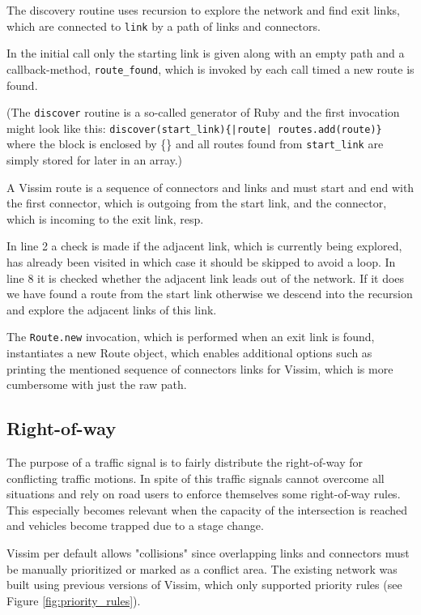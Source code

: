 The discovery routine uses recursion to explore the network and find exit links, which are connected to \verb|link| by a path of links and connectors.

In the initial call only the starting link is given along with an empty path and a callback-method, \verb|route_found|, which is invoked by each call timed a new route is found. 

(The \verb|discover| routine is a so-called generator of Ruby and the first invocation might look like this: \verb+discover(start_link){|route| routes.add(route)}+ where the block is enclosed by \{\} and all routes found from \verb|start_link| are simply stored for later in an array.)

A Vissim route is a sequence of connectors and links and must start and end with the first connector, which is outgoing from the start link, and the connector, which is incoming to the exit link, resp.

In line 2 a check is made if the adjacent link, which is currently being explored, has already been visited in which case it should be skipped to avoid a loop. In line 8 it is checked whether the adjacent link leads out of the network. If it does we have found a route from the start link otherwise we descend into the recursion and explore the adjacent links of this link.

The \verb|Route.new| invocation, which is performed when an exit link is found, instantiates a new Route object, which enables additional options such as printing the mentioned sequence of connectors links for Vissim, which is more cumbersome with just the raw path.

\subsection{Right-of-way}
The purpose of a traffic signal is to fairly distribute the right-of-way for conflicting traffic motions.  In spite of this traffic signals cannot overcome all situations and rely on road users to enforce themselves some right-of-way rules. This especially becomes relevant when the capacity of the intersection is reached and vehicles become trapped due to a stage change.

Vissim per default allows "collisions" since overlapping links and connectors must be manually prioritized or marked as a conflict area. The existing network was built using previous versions of Vissim, which only supported priority rules (see Figure \ref{fig:priority_rules}). 

